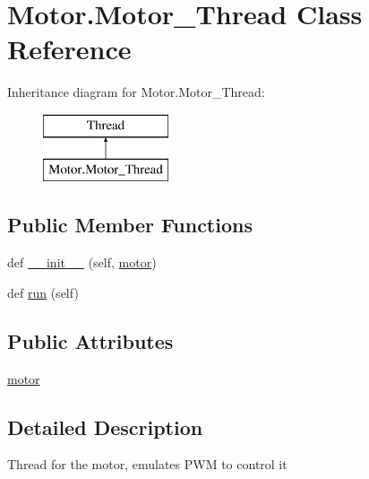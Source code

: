 \hypertarget{class_motor_1_1_motor___thread}{}\section{Motor.\+Motor\+\_\+\+Thread Class Reference}
\label{class_motor_1_1_motor___thread}
Inheritance diagram for Motor.\+Motor\+\_\+\+Thread\+:\begin{figure}[H]
\begin{center}
\leavevmode
\includegraphics[height=2.000000cm]{class_motor_1_1_motor___thread}
\end{center}
\end{figure}
\subsection*{Public Member Functions}
\begin{DoxyCompactItemize}
\item 
def \mbox{\hyperlink{class_motor_1_1_motor___thread_a5610243ba8010e6b71669361f8d9f005}{\+\_\+\+\_\+init\+\_\+\+\_\+}} (self, \mbox{\hyperlink{class_motor_1_1_motor___thread_a67c6a328eb97c9a8ea0524b43a29f15c}{motor}})
\item 
def \mbox{\hyperlink{class_motor_1_1_motor___thread_a940954129ae966e7250b3335d4a78f1d}{run}} (self)
\end{DoxyCompactItemize}
\subsection*{Public Attributes}
\begin{DoxyCompactItemize}
\item 
\mbox{\hyperlink{class_motor_1_1_motor___thread_a67c6a328eb97c9a8ea0524b43a29f15c}{motor}}
\end{DoxyCompactItemize}


\subsection{Detailed Description}
\begin{DoxyVerb}Thread for the motor, emulates PWM to control it
\end{DoxyVerb}
 

